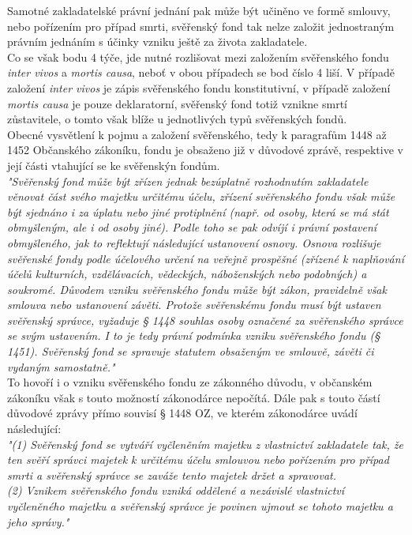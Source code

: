 \documentclass{article}
\begin{document}
Samotné zakladatelské právní jednání pak může být učiněno ve formě smlouvy, nebo pořízením pro případ smrti, svěřenský fond tak nelze založit jednostraným právním jednáním s účinky vzniku ještě za života zakladatele.\\

Co se však bodu 4 týče, jde nutné rozlišovat mezi založením svěřenského fondu \textit{inter vivos} a \textit{mortis causa}, neboť v obou případech se bod číslo 4 liší. V případě založení \textit{inter vivos} je zápis svěřenského fondu konstitutivní, v případě založení \textit{mortis causa} je pouze deklaratorní, svěřenský fond totiž vznikne smrtí zůstavitele, o tomto však blíže u jednotlivých typů svěřenských fondů.\\

Obecné vysvětlení k pojmu a založení svěřenského, tedy k paragrafům 1448 až 1452 Občanského zákoníku, fondu je obsaženo již v důvodové zprávě, respektive v její části vtahující se ke svěřenskýn fondům.\\

\textit{"Svěřenský fond může být zřízen jednak bezúplatně rozhodnutím zakladatele věnovat část svého majetku určitému účelu, zřízení svěřenského fondu však může být sjednáno i za úplatu nebo jiné protiplnění (např. od osoby, která se má stát obmyšleným, ale i od osoby jiné). Podle toho se pak odvíjí i právní postavení obmyšleného, jak to reflektují následující ustanovení osnovy. Osnova rozlišuje svěřenské fondy podle účelového určení na veřejně prospěšné (zřízené k naplňování účelů kulturních, vzdělávacích, vědeckých, náboženských nebo podobných) a soukromé. Důvodem vzniku svěřenského fondu může být zákon, pravidelně však smlouva nebo ustanovení závěti. Protože svěřenskému fondu musí být ustaven svěřenský správce, vyžaduje § 1448 souhlas osoby označené za svěřenského správce se svým ustavením. I to je tedy právní podmínka vzniku svěřenského fondu (§ 1451). Svěřenský fond se spravuje statutem obsaženým ve smlouvě, závěti či vydaným samostatně."}\\

To hovoří i o vzniku svěřenského fondu ze zákonného důvodu, v občanském zákoníku však s touto možností zákonodárce nepočítá. Dále pak s touto částí důvodové zprávy přímo souvisí § 1448 OZ, ve kterém zákonodárce uvádí následující:\\

\noindent\textit{"(1) Svěřenský fond se vytváří vyčleněním majetku z vlastnictví zakladatele tak, že ten svěří správci majetek k určitému účelu smlouvou nebo pořízením pro případ smrti a svěřenský správce se zaváže tento majetek držet a spravovat.\\
(2) Vznikem svěřenského fondu vzniká oddělené a nezávislé vlastnictví vyčleněného majetku a svěřenský správce je povinen ujmout se tohoto majetku a jeho správy."}\\
\end{document}
